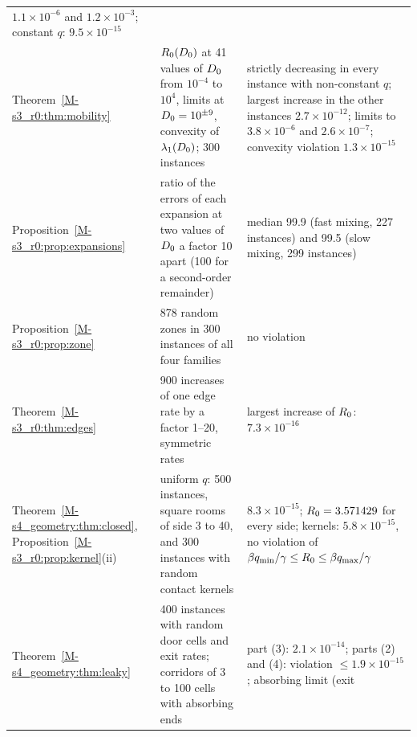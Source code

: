 \begin{table}[tbp]
\begin{tabular}{@{}>{\raggedright\arraybackslash}p{2.9cm}p{6.0cm}p{6.2cm}@{}}
 $1.1\times10^{-6}$ and $1.2\times10^{-3}$; constant $q$: $9.5\times10^{-15}$\\
\addlinespace[3pt]
Theorem~\ref{M-s3_r0:thm:mobility} &
 $R_0(D_0)$ at 41 values of $D_0$ from $10^{-4}$ to $10^{4}$, limits at $D_0=10^{\pm9}$, convexity of
 $\lambda_1(D_0)$; 300 instances &
 strictly decreasing in every instance with non-constant $q$; largest increase in the other instances
 $2.7\times10^{-12}$; limits to $3.8\times10^{-6}$ and $2.6\times10^{-7}$; convexity violation
 $1.3\times10^{-15}$\\
\addlinespace[3pt]
Proposition~\ref{M-s3_r0:prop:expansions} &
 ratio of the errors of each expansion at two values of $D_0$ a factor 10 apart (100 for a second-order
 remainder) & median 99.9 (fast mixing, 227 instances) and 99.5 (slow mixing, 299 instances)\\
\addlinespace[3pt]
Proposition~\ref{M-s3_r0:prop:zone} &
 878 random zones in 300 instances of all four families & no violation\\
\addlinespace[3pt]
Theorem~\ref{M-s3_r0:thm:edges} &
 900 increases of one edge rate by a factor 1--20, symmetric rates &
 largest increase of $R_0$: $7.3\times10^{-16}$\\
\addlinespace[3pt]
Theorem~\ref{M-s4_geometry:thm:closed}, Proposition~\ref{M-s3_r0:prop:kernel}(ii) &
 uniform $q$: 500 instances, square rooms of side 3 to 40, and 300 instances with random contact kernels &
 $8.3\times10^{-15}$; $R_0=3.571429$ for every side; kernels: $5.8\times10^{-15}$, no violation of
 $\beta q_{\min}/\gamma\le R_0\le\beta q_{\max}/\gamma$\\
\addlinespace[3pt]
Theorem~\ref{M-s4_geometry:thm:leaky} &
 400 instances with random door cells and exit rates; corridors of 3 to 100 cells with absorbing ends &
 part (3): $2.1\times10^{-14}$; parts (2) and (4): violation $\le1.9\times10^{-15}$; absorbing limit (exit

\end{tabular}
\end{table}
